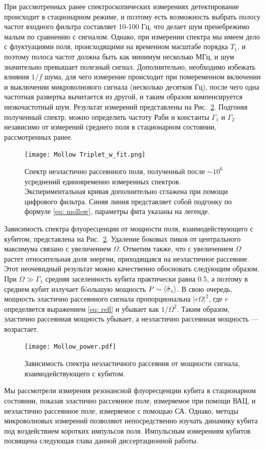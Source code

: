 При рассмотренных ранее спектроскопических измерениях детектирование происходит в стационарном режиме, и поэтому есть возможность выбрать полосу частот входного фильтра составляет 10-100 Гц, что делает шум пренебрежимо малым по сравнению с сигналом. Однако, при измерении спектра мы имеем дело с флуктуациями поля, происходящими на временном масштабе порядка $T_1$, и поэтому полоса частот должна быть как минимум несколько МГц, и шум значительно превышает полезный сигнал. Дополнительно, необходимо избежать влияния $1/f$ шума, для чего измерение происходит при помеременном включении и выключении микроволнового сигнала (несколько десятков Гц), после чего одна частотная развертка вычитается из другой, и таким образом компенсируется низкочастотный шум. Результат измерений представлены на Рис.~\ref{fig: Mollow_w_fit}. Подгоняя полученный спектр, можно определить частоту Раби и константы $\Gamma_1$ и $\Gamma_2$ независимо от измерений среднего поля в стационарном состоянии, рассмотренных ранее. 
\begin{figure}
	\centering
	\texttt{[image: Mollow Triplet\_w\_fit.png]}
	\caption[Спектр неэластично рассеянного поля на кубите.]{Спектр неэластично рассеянного поля, полученный после $\sim 10^6$ усреднений единовременно измеренных спектров. Экспериментальная кривая дополнительно сглажена при помощи цифрового фильтра. Синяя линия представляет собой подгонку по формуле \eqref{eq: mollow}, параметры фита указаны на легенде.}
	\label{fig: Mollow_w_fit}
\end{figure}

Зависимость спектра флуоресценции от мощности поля, взаимодействующего с кубитом, представлена на Рис.~\ref{fig: Mollow_w_fit}. Удаление боковых пиков от центрального максимума связано с увеличением $\Omega$. Отметим также, что с увеличением $\Omega$ растет относительная доля энергии, приходящаяся на неэластичное рассеяние. Этот неочевидный результат можно качественно обосновать следующим образом. При $\Omega \gg \Gamma_1$ средняя заселенность кубита практически равна 0.5, а поэтому в среднем кубит излучает б\'{o}ольшую мощность $P \sim \braket{\hat{\sigma}_z}$. В свою очередь, мощность эластично рассеянного сигнала пропорциональна $|r\Omega|^2$, где $r$ определяется выражением \eqref{eq: refl} и убывает как $1/\Omega^2$. Таким образом, эластично рассеянная мощность убывает, а неэластично рассеянная мощность --- возрастает. 

\begin{figure}
	\centering
	\texttt{[image: Mollow\_power.pdf]}
	\caption[Зависимость триплета Моллоу от мощности драйва.]{Зависимость спектра неэластичного рассеяния от мощности сигнала, взаимодействующего с кубитом. }
	\label{fig: Mollow_w_fit}
\end{figure} 
Мы рассмотрели измерения резонансной флуоресценции кубита в стационарном состоянии, показав эластично рассеянное поле, измеряемое при помощи ВАЦ, и неэластично рассеянное поле, измеряемое с помощью СА. Однако, методы микроволновых измерений позволяют непосредственно изучать динамику кубита под воздействием коротких импульсов поля. Импульсным измерениям кубитов посвящена следующая глава данной диссертационной работы. 
